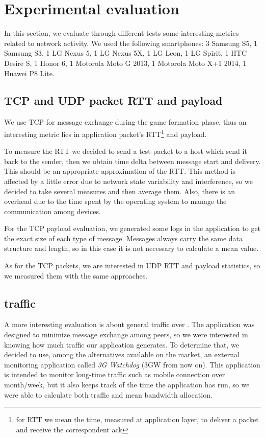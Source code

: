 \section{Experimental evaluation}

In this section, we evaluate through different tests some interesting metrics
related to network activity. We used the following smartphones: 3 Samsung S5,
1 Samsung S3, 1 LG Nexus 5, 1 LG Nexus 5X, 1 LG Leon, 1 LG Spirit, 1 HTC Desire
S, 1 Honor 6, 1 Motorola Moto G 2013, 1 Motorola Moto X+1 2014, 1 Huawei P8
Lite.

\subsection{TCP and UDP packet RTT and payload}
We use TCP for message exchange during the game formation phase, thus an interesting metric lies in application packet's RTT\footnote{for RTT we mean the time, measured at application layer, to deliver a packet and receive the correspondent ack} and payload.
 
To measure the RTT we decided to send a test-packet to a host which send it
back to the sender, then we obtain time delta between message start and
delivery. This should be an appropriate approximation of the RTT. This method
is affected by a little error due to network state variability and
interference, so we decided to take several measures and then average them.
Also, there is an overhead due to the time spent by the operating system to
manage the communication among devices.

For the TCP payload evaluation, we generated some logs in the application to get the exact size of each type of message. Messages always carry the same data structure and length, so in this case it is not necessary to calculate a mean value.

As for the TCP packets, we are interested in UDP RTT and payload statistics, so we measured them with the same approaches.

\subsection{\wifi{} traffic}

A more interesting evaluation is about general traffic over \wifi. The application was designed to minimize message exchange among peers, so we were interested in knowing how much traffic our application generates. To determine that, we decided to use, among the alternatives available on the market, an external monitoring application called \textit{3G Watchdog} (3GW from now on). This application is intended to monitor long-time traffic such as mobile connection over month/week, but it also keeps track of the time the application has run, so we were able to calculate both traffic and mean bandwidth allocation.

